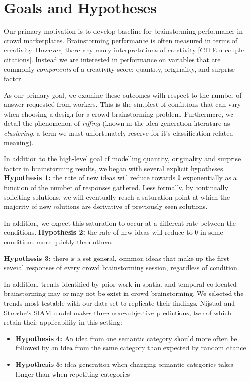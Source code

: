 \section{Goals and Hypotheses}

Our primary motivation is to develop baseline for brainstorming performance in crowd marketplaces. Brainstorming performance is often measured in terms of creativity. However, there any many interpretations of creativity [CITE a couple citations]. Instead we are interested in performance on variables that are commonly \emph{components} of a creativity score: quantity, originality, and surprise factor.

As our primary goal, we examine these outcomes with respect to the number of answer requested from workers. This is the simplest of conditions that can vary when choosing a design for a crowd brainstorming problem. Furthermore, we detail the phenomenon of \emph{riffing} (known in the idea generation literature as \emph{clustering}, a term we must unfortunately reserve for it's classification-related meaning).

In addition to the high-level goal of modelling quantity, originality and surprise factor in brainstorming results, we began with several explicit hypotheses. \textbf{Hypothesis 1:} the rate of new ideas will reduce towards 0 exponentially as a function of the number of responses gathered. Less formally, by continually soliciting solutions, we will eventually reach a saturation point at which the majority of new solutions are derivative of previously seen solutions.

In addition, we expect this saturation to occur at a different rate between the conditions. \textbf{Hypothesis 2:} the rate of new ideas will reduce to 0 in some conditions more quickly than others.

\textbf{Hypothesis 3:} there is a set general, common ideas that make up the first several responses of every crowd brainstorming session, regardless of condition. 

In addition, trends identified by prior work in spatial and temporal co-located brainstorming may or may not be exist in crowd brainstorming. We selected the trends most testable with our data set to replicate their findings. Nijstad and Stroebe's SIAM model \cite{nijstad_how_2006} makes three non-subjective predictions, two of which retain their applicability in this setting:

\begin{itemize}
\item \textbf{Hypothesis 4:} An idea from one semantic category should more often be followed by an idea from the same category than expected by random chance
\item \textbf{Hypothesis 5:} idea generation when changing semantic categories takes longer than when repetiting categories
\end{itemize}

